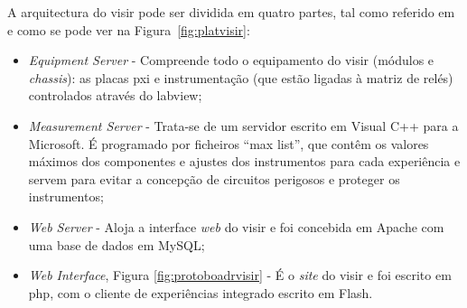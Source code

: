 A arquitectura do \acrshort{visir} pode ser dividida em quatro partes, tal como referido em \cite{tawfikexperiences} e como se pode ver na Figura~\ref{fig:platvisir}:
\begin{itemize}
    \item \textit{Equipment  Server} - Compreende todo o equipamento do \acrshort{visir} (módulos e \textit{chassis}): as placas \acrfull{pxi} e instrumentação (que estão ligadas à matriz de relés) controlados através do \acrshort{labview};
    \item \textit{Measurement Server} - Trata-se de um servidor escrito em Visual C++ para a Microsoft. É programado por ficheiros ``max list'', que contêm os valores máximos dos componentes e ajustes dos instrumentos para cada experiência e servem para evitar a concepção de circuitos perigosos e proteger os instrumentos;
    \item \textit{Web Server} - Aloja a interface \textit{web} do \acrshort{visir} e foi concebida em Apache com uma base de dados em MySQL;
    \item \textit{Web Interface}, Figura \ref{fig:protoboadrvisir} - É o \textit{site} do \acrshort{visir} e foi escrito em \acrfull{php}, com o cliente de experiências integrado escrito em Flash.
\end{itemize}

